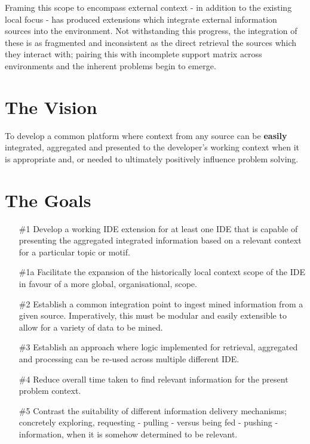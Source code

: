 Framing this scope to encompass external context - in addition to the existing local focus - has produced extensions which integrate external information sources into the environment. Not withstanding this progress, the integration of these is as fragmented and inconsistent as the direct retrieval the sources which they interact with; pairing this with incomplete support matrix across environments and the inherent problems begin to emerge.



\section{The Vision}

To develop a common platform where context from any source can be \textbf{easily} integrated, aggregated and presented to the developer's working context when it is appropriate and, or needed to ultimately positively influence problem solving. 

\section{The Goals}

\begin{enumerate}
	\item[\#1] Develop a working IDE extension for at least one IDE that is capable of presenting the aggregated integrated information based on a relevant context for a particular topic or motif. 
	
	\item[\#1a] Facilitate the expansion of the historically local context scope of the IDE in favour of a more global, organisational, scope.
	
	\item[\#2] Establish a common integration point to ingest mined information from a given source. Imperatively, this must be modular and easily extensible to allow for a variety of data to be mined.
	
	\item[\#3] Establish an approach where logic implemented for retrieval, aggregated and processing can be re-used across multiple different IDE.
	
	\item[\#4] Reduce overall time taken to find relevant information for the present problem context.
	
	\item[\#5] Contrast the suitability of different information delivery mechanisms; concretely exploring, requesting - pulling - versus being fed - pushing - information, when it is somehow determined to be relevant. 
	
\end{enumerate}